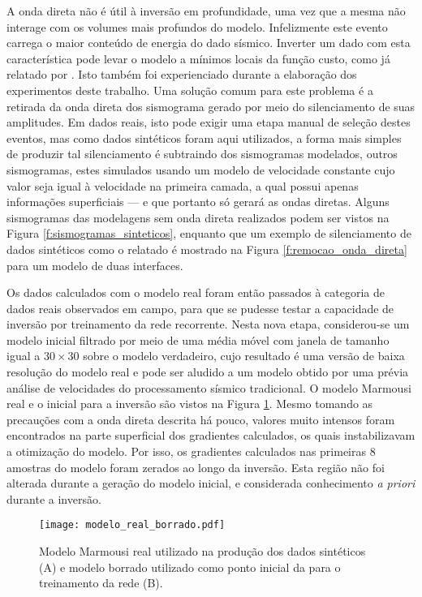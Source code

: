     A onda direta não é útil à inversão em profundidade, uma vez que a mesma não interage com os volumes mais profundos do modelo. Infelizmente este evento carrega o maior conteúdo de energia do dado sísmico. Inverter um dado com esta característica pode levar o modelo a mínimos locais da função custo, como já relatado por . Isto também foi experienciado durante a elaboração dos experimentos deste trabalho. Uma solução comum para este problema é a retirada da onda direta dos sismograma gerado por meio do silenciamento de suas amplitudes. Em dados reais, isto pode exigir uma etapa manual de seleção destes eventos, mas como dados sintéticos foram aqui utilizados, a forma mais simples de produzir tal silenciamento é subtraindo dos sismogramas modelados, outros sismogramas, estes simulados usando um modelo de velocidade constante cujo valor seja igual à velocidade na primeira camada, a qual possui apenas informações superficiais --- e que portanto só gerará as ondas diretas. Alguns sismogramas das modelagens sem onda direta realizados podem ser vistos na Figura \ref{f:sismogramas_sinteticos}, enquanto que um exemplo de silenciamento de dados sintéticos como o relatado é mostrado na Figura \ref{f:remocao_onda_direta} para um modelo de duas interfaces.

    Os dados calculados com o modelo real foram então passados à categoria de dados reais observados em campo, para que se pudesse testar a capacidade de inversão por treinamento da rede recorrente. Nesta nova etapa, considerou-se um modelo inicial filtrado por meio de uma média móvel com janela de tamanho igual a $30\times30$ sobre o modelo verdadeiro, cujo resultado é uma versão de baixa resolução do modelo real e pode ser aludido a um modelo obtido por uma prévia análise de velocidades do processamento sísmico tradicional. O modelo Marmousi real e o inicial para a inversão são vistos na Figura \ref{f:modelo_real_borrado}. Mesmo tomando as precauções com a onda direta descrita há pouco, valores muito intensos foram encontrados na parte superficial dos gradientes calculados, os quais instabilizavam a otimização do modelo. Por isso, os gradientes calculados nas primeiras 8 amostras do modelo foram zerados ao longo da inversão. Esta região não foi alterada durante a geração do modelo inicial, e considerada conhecimento \textit{a priori} durante a inversão.

      \begin{figure}
        \begin{center}
          \texttt{[image: modelo\_real\_borrado.pdf]}
        \end{center}
        \caption{Modelo Marmousi real utilizado na produção dos dados sintéticos (A) e modelo borrado utilizado como ponto inicial da para o treinamento da rede (B).}
        \label{f:modelo_real_borrado}
      \end{figure}


